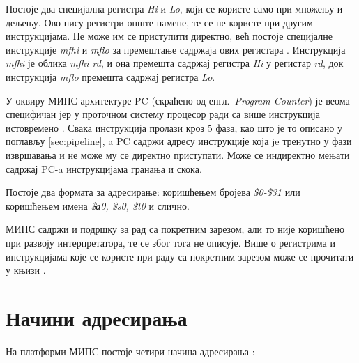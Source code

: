 \documentclass[12pt,oneside]{memoir}
\begin{document}
Постоје два специјална регистра \textit{Hi} и \textit{Lo}, који се користе само при множењу и дељењу. Ово нису регистри опште намене, те се не користе при другим инструкцијама. Не може им се приступити директно, већ постоје специјалне инструкције \textit{mfhi} и \textit{mflo} за премештање садржаја ових регистара \cite{mips}. Инструкција \textit{mfhi} је облика \textit{mfhi rd}, и она премешта садржај регистра  \textit{Hi} у регистар \textit{rd}, док инструкција \textit{mflo} премешта садржај регистра \textit{Lo}.

У оквиру МИПС архитектуре PC (скраћено од енгл.~\textit{Program Counter}) је веома специфичан јер у проточном систему процесор ради са више инструкција истовремено \cite{mips}. Свака инструкција пролази кроз 5 фаза, као што је то описано у поглављу \ref{sec:pipeline}, a PC садржи адресу инструкције која je тренутно у фази извршавања и не може му се директно приступати. Може се индиректно мењати садржај PC-a инструкцијама гранања и скока.

Постоје два формата за адресирање: коришћењем бројева \textit{\$0-\$31} или коришћењем имена \textit{\$а0, \$s0, \$t0} и слично.

МИПС садржи и подршку за рад са покретним зарезом, али то није коришћено при развоју интерпретатора, те се због тога не описује. Више о регистрима и инструкцијама које се користе при раду са покретним зарезом може се прочитати у књизи \cite{mips}.

\section{Начини адресирања}
\label{adresiranje}

На платформи МИПС постоје четири начина адресирања \cite{mips}:
\end{document}
